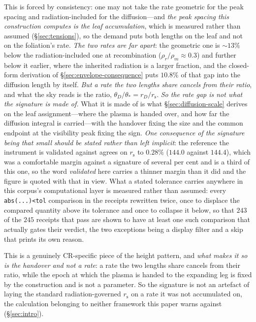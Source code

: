 \documentclass[11pt,a4paper]{article}
\theoremstyle{plain}
\theoremstyle{definition}
\theoremstyle{remark}
\newcommand{\rs}{r_{\mathrm{s}}}
\begin{document}
This is forced by consistency: one may not take the rate geometric for the peak spacing and radiation-included for the diffusion---and \emph{the peak spacing this construction computes is the leaf accumulation}, which is measured rather than assumed (\S\ref{sec:tensions}), so the demand puts both lengths on the leaf and not on the foliation's rate. \emph{The two rates are far apart}: the geometric one is ${\sim}13\%$ below the radiation-included one at recombination ($\rho_r/\rho_m\approx0.3$) and further below it earlier, where the inherited radiation is a larger fraction, and the closed-form derivation of \S\ref{sec:envelope-consequence} puts $10.8\%$ of that gap into the diffusion length by itself. \emph{But a rate the two lengths share cancels from their ratio}, and what the sky reads is the ratio, $\theta_D/\theta_*=r_D/\rs$. \emph{So the rate gap is not what the signature is made of.} What it is made of is what \S\ref{sec:diffusion-scale} derives on the leaf assignment---where the plasma is handed over, and how far the diffusion integral is carried---with the handover fixing the size and the common endpoint at the visibility peak fixing the sign. \emph{One consequence of the signature being that small should be stated rather than left implicit}: the reference the instrument is validated against agrees on $\rs$ to $0.28\%$ ($144.0$ against $144.4$), which was a comfortable margin against a signature of several per cent and is a third of this one, so the word \emph{validated} here carries a thinner margin than it did and the figure is quoted with that in view. What a stated tolerance carries anywhere in this corpus's computational layer is measured rather than assumed: every \verb|abs(...)<tol| comparison in the receipts rewritten twice, once to displace the compared quantity above its tolerance and once to collapse it below, so that $243$ of the $245$ receipts that pass are shown to have at least one such comparison that actually gates their verdict, the two exceptions being a display filter and a skip that prints its own reason. 

This is a genuinely CR-specific piece of the height pattern, and \emph{what makes it so is the handover and not a rate}: a rate the two lengths share cancels from their ratio, while the epoch at which the plasma is handed to the expanding leg is fixed by the construction and is not a parameter. So the signature is not an artefact of laying the standard radiation-governed $\rs$ on a rate it was not accumulated on, the calculation belonging to neither framework this paper warns against (\S\ref{sec:intro}). 
\end{document}
